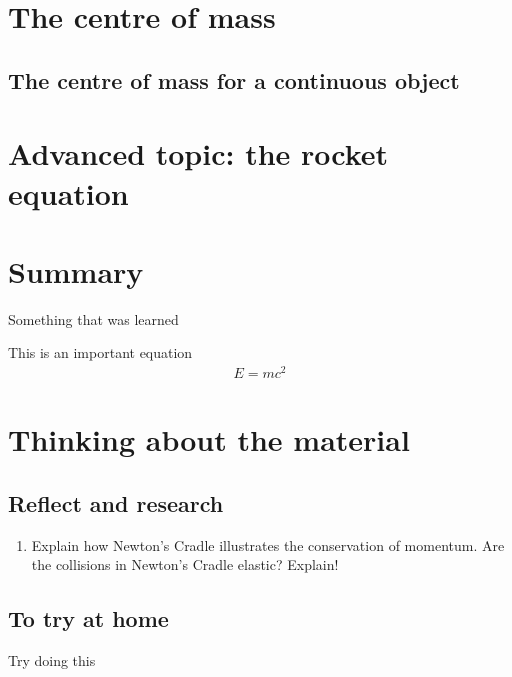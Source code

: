 \section{The centre of mass}

\subsection{The centre of mass for a continuous object}

\section{Advanced topic: the rocket equation}


\newpage
\section{Summary}

\begin{chapterSummary}{
\item Something that was learned
}
\end{chapterSummary}

\newpage
\begin{importantEquations}
This is an important equation
\begin{align*}
E = mc^2
\end{align*}

\end{importantEquations}


\newpage
\section{Thinking about the material}
\subsection{Reflect and research}

\begin{enumerate}
\item Explain how Newton's Cradle illustrates the conservation of momentum. Are the collisions in Newton's Cradle elastic? Explain! 
\end{enumerate}
\subsection{To try at home}

\begin{tQuestion}Try doing this \end{tQuestion}

